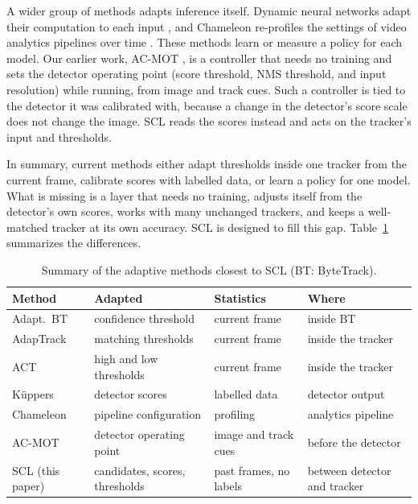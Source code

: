 \documentclass[pdflatex,sn-mathphys-num,iicol]{sn-jnl}
\newcommand{\scl}{SCL}
\begin{document}
A wider group of methods adapts inference itself. Dynamic neural networks
adapt their computation to each input \cite{han2022dynamic}, and Chameleon
re-profiles the settings of video analytics pipelines over time
\cite{jiang2018chameleon}. These methods learn or measure a policy for each
model. Our earlier work, AC-MOT \cite{ismail2026acmot}, is a controller that
needs no training and sets the detector operating point (score threshold,
NMS threshold, and input resolution) while running, from image and track
cues. Such a controller is tied to the detector it was calibrated with,
because a change in the detector's score scale does not change the image.
\scl{} reads the scores instead and acts on the tracker's input and
thresholds.

In summary, current methods either adapt thresholds inside one tracker from
the current frame, calibrate scores with labelled data, or learn a policy for
one model. What is missing is a layer that needs no training, adjusts itself
from the detector's own scores, works with many unchanged trackers, and keeps
a well-matched tracker at its own accuracy. \scl{} is designed to fill this
gap. Table~\ref{tab:related} summarizes the differences.

\begin{table}[t]
\caption{Summary of the adaptive methods closest to \scl{} (BT: ByteTrack).}
\label{tab:related}
\centering\footnotesize
\setlength{\tabcolsep}{3pt}
\begin{tabular}{@{}>{\raggedright\arraybackslash}p{17mm}>{\raggedright\arraybackslash}p{18mm}>{\raggedright\arraybackslash}p{15mm}>{\raggedright\arraybackslash}p{18mm}@{}}
\toprule
Method & Adapted & Statistics & Where\\
\midrule
Adapt.\ BT \cite{ma2023adaptivebytetrack} & confidence threshold & current frame & inside BT\\
AdapTrack \cite{shim2024adaptrack} & matching thresholds & current frame & inside the tracker\\
ACT \cite{act2026adaptive} & high and low thresholds & current frame & inside the tracker\\
K{\"u}ppers \cite{kuppers2020detcalib} & detector scores & labelled data & detector output\\
Chameleon \cite{jiang2018chameleon} & pipeline configuration & profiling & analytics pipeline\\
AC-MOT \cite{ismail2026acmot} & detector operating point & image and track cues & before the detector\\
\scl{} (this paper) & candidates, scores, thresholds & past frames, no labels & between detector and tracker\\
\bottomrule
\end{tabular}
\end{table}
\end{document}
